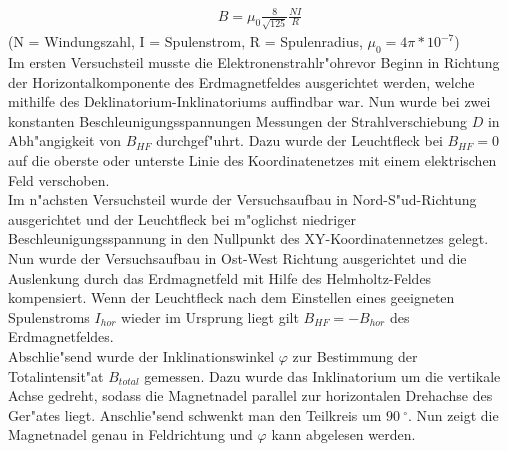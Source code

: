 		\begin{eqnarray*}
			B = \mu_0 \frac{8}{\sqrt{125}} \frac{NI}{R}
		\end{eqnarray*}
		{\centering
		(N = Windungszahl, I = Spulenstrom, R = Spulenradius, $\mu_0 = 4\pi*10^{-7}$)\\
		}
		\vspace{0.3 cm}    
		Im ersten Versuchsteil musste die Elektronenstrahlr"ohrevor Beginn in Richtung der Horizontalkomponente des Erdmagnetfeldes ausgerichtet werden, welche mithilfe des Deklinatorium-Inklinatoriums auffindbar war. Nun wurde bei zwei konstanten Be\-schleu\-ni\-gungs\-span\-nun\-gen Messungen der Strahlverschiebung $D$ in Abh"angigkeit von $B_{HF}$ durchgef"uhrt. Dazu wurde der Leuchtfleck bei $B_{HF} = 0$ auf die oberste oder unterste Linie des Koordinatenetzes mit einem elektrischen Feld verschoben.\\
		\newline
		Im n"achsten Versuchsteil wurde der Versuchsaufbau in Nord-S"ud-Richtung ausgerichtet und der Leuchtfleck bei m"oglichst niedriger Be\-schleu\-ni\-gungs\-span\-nun\-g in den Nullpunkt des XY-Koordinatennetzes gelegt.
		Nun wurde der Versuchsaufbau in Ost-West Richtung ausgerichtet und die Auslenkung durch das Erdmagnetfeld mit Hilfe des Helmholtz-Feldes kompensiert. Wenn der Leuchtfleck nach dem Einstellen eines geeigneten Spu\-len\-stroms $I_{hor}$ wieder im Ursprung liegt gilt $B_{HF} = -B_{hor}$ des Erdmagnetfeldes.\\
		\newline
		Abschlie"send wurde der Inklinationswinkel $\varphi$ zur Bestimmung der Totalintensit"at $B_{total}$ gemessen.
		Dazu wurde das Inklinatorium um die vertikale Achse gedreht, sodass die Magnetnadel parallel zur horizontalen Drehachse des Ger"ates liegt.
		Anschlie"send schwenkt man den Teilkreis um $\SI{90}{^\circ}$. Nun zeigt die Magnetnadel genau in Feldrichtung und $\varphi$ kann abgelesen werden.